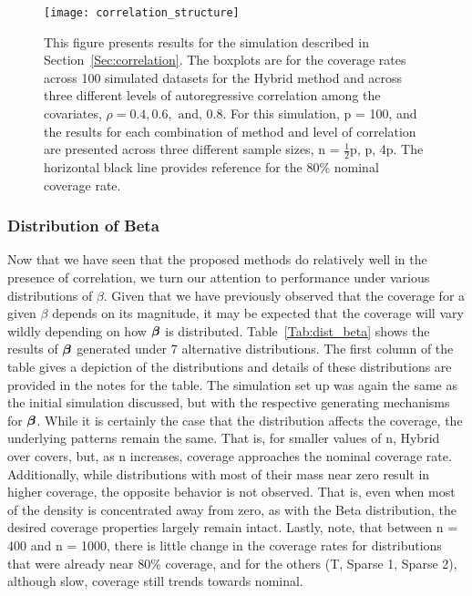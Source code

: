 \begin{figure}[hbtp]
  \begin{center}
  \texttt{[image: correlation\_structure]}
  \caption{\label{Fig:correlation_structure} This figure presents results for the simulation described in Section~\ref{Sec:correlation}. The boxplots are for the coverage rates across 100 simulated datasets for the Hybrid method and across three different levels of autoregressive correlation among the covariates, $\rho = 0.4, 0.6, \text{ and, } 0.8$. For this simulation, p = 100, and the results for each combination of method and level of correlation are presented across three different sample sizes, n = $\frac{1}{2}$p, p, 4p. The horizontal black line provides reference for the 80\% nominal coverage rate.}
  \end{center}
\end{figure}

\subsubsection{Distribution of Beta}\label{Sec:Distribution}

Now that we have seen that the proposed methods do relatively well in the presence of correlation, we turn our attention to performance under various distributions of $\beta$. Given that we have previously observed that the coverage for a given $\beta$ depends on its magnitude, it may be expected that the coverage will vary wildly depending on how $\boldsymbol{\beta}$ is distributed. Table~\ref{Tab:dist_beta} shows the results of $\boldsymbol{\beta}$ generated under 7 alternative distributions. The first column of the table gives a depiction of the distributions and details of these distributions are provided in the notes for the table. The simulation set up was again the same as the initial simulation discussed, but with the respective generating mechanisms for $\boldsymbol{\beta}$. While it is certainly the case that the distribution affects the coverage, the underlying patterns remain the same. That is, for smaller values of n, Hybrid over covers, but, as n increases, coverage approaches the nominal coverage rate. Additionally, while distributions with most of their mass near zero result in higher coverage, the opposite behavior is not observed. That is, even when most of the density is concentrated away from zero, as with the Beta distribution, the desired coverage properties largely remain intact. Lastly, note, that between n = 400 and n = 1000, there is little change in the coverage rates for distributions that were already near 80\% coverage, and for the others (T, Sparse 1, Sparse 2), although slow, coverage still trends towards nominal.

